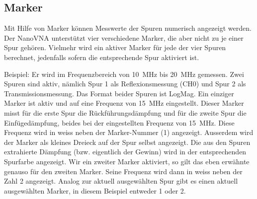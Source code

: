 \documentclass[twoside,a4paper,11pt,halfparskip,DIV=11,notitlepage]{scrartcl}
\begin{document}
\subsection{Marker}
\begin{center}\end{center}

Mit Hilfe von Marker können Messwerte der Spuren numerisch angezeigt werden. Der NanoVNA
unterstützt vier verschiedene Marker, die aber nicht zu je einer Spur gehören. Vielmehr
wird ein aktiver Marker für jede der vier Spuren berechnet, jedenfalls sofern die entsprechende
Spur aktiviert ist.

Beispiel: Er wird im Frequenzbereich von 10~MHz bis 20~MHz gemessen. Zwei Spuren sind aktiv,
nämlich Spur 1 als Reflexionsmessung (CH0) und Spur 2 als Transmissionsmessung. Das Format beider
Spuren ist LogMag. Ein einziger Marker ist aktiv und auf eine Frequenz von
15~MHz eingestellt. Dieser Marker misst für die erste Spur die Rückführungsdämpfung und für
die zweite Spur die Einfügedämpfung, beides bei der eingestellten Frequenz von 15~MHz. Diese
Frequenz wird in weiss neben der Marker-Nummer (1) angezeigt. Ausserdem wird der Marker als
kleines Dreieck auf der Spur selbst angezeigt. Die aus den Spuren extrahierte
Dämpfung (bzw. eigentlich der Gewinn) wird in der entsprechenden Spurfarbe
angezeigt. Wir ein zweiter Marker aktiviert, so gilt das eben erwähnte genauso für den zweiten
Marker. Seine Frequenz wird dann in weiss neben der Zahl 2 angezeigt. Analog zur aktuell
ausgewählten Spur gibt es einen aktuell ausgewählten Marker, in diesem Beispiel entweder 1 oder
2.
\end{document}
